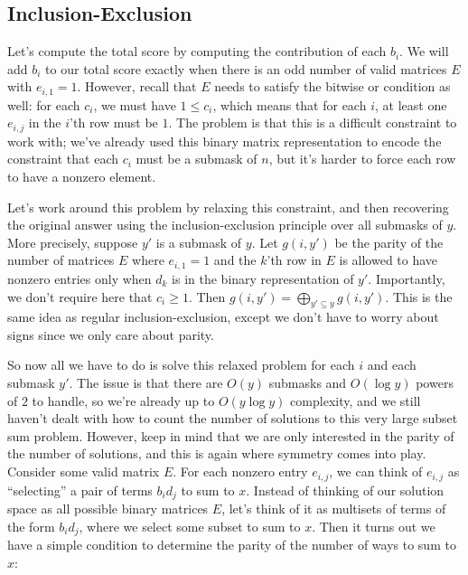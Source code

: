 \documentclass[11pt]{scrartcl}
\begin{document}

\subsection{Inclusion-Exclusion}

Let's compute the total score by computing the contribution of each $b_i$.
We will add $b_i$ to our total score exactly when there is an odd number of valid matrices $E$ with $e_{i, 1} = 1$.
However, recall that $E$ needs to satisfy the bitwise or condition as well: for each $c_i$, we must have $1 \leq c_i$, which means that for each $i$, at least one $e_{i, j}$ in the $i$'th row must be $1$.
The problem is that this is a difficult constraint to work with; we've already used this binary matrix representation to encode the constraint that each $c_i$ must be a submask of $n$, but it's harder to force each row to have a nonzero element.

Let's work around this problem by relaxing this constraint, and then recovering the original answer using the inclusion-exclusion principle over all submasks of $y$.
More precisely, suppose $y'$ is a submask of $y$.
Let $g(i, y')$ be the parity of the number of matrices $E$ where $e_{i, 1} = 1$ and the $k$'th row in $E$ is allowed to have nonzero entries only when $d_k$ is in the binary representation of $y'$.
Importantly, we don't require here that $c_i \geq 1$.
Then $g(i, y') = \bigoplus_{y' \subseteq y} g(i, y')$.
This is the same idea as regular inclusion-exclusion, except we don't have to worry about signs since we only care about parity.

So now all we have to do is solve this relaxed problem for each $i$ and each submask $y'$.
The issue is that there are $O(y)$ submasks and $O(\log y)$ powers of $2$ to handle, so we're already up to $O(y \log y)$ complexity, and we still haven't dealt with how to count the number of solutions to this very large subset sum problem.
However, keep in mind that we are only interested in the parity of the number of solutions, and this is again where symmetry comes into play.
Consider some valid matrix $E$. 
For each nonzero entry $e_{i, j}$, we can think of $e_{i, j}$ as ``selecting'' a pair of terms $b_i d_j$ to sum to $x$.
Instead of thinking of our solution space as all possible binary matrices $E$, let's think of it as multisets of terms of the form $b_i d_j$, where we select some subset to sum to $x$.
Then it turns out we have a simple condition to determine the parity of the number of ways to sum to $x$:
\end{document}
